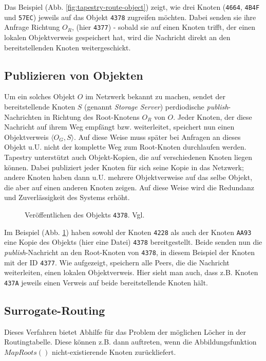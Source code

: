 Das Beispiel (Abb. \ref{fig:tapestry-route-object}) zeigt, wie drei Knoten
(\texttt{4664}, \texttt{4B4F} und \texttt{57EC}) jeweils auf das Objekt
\texttt{4378} zugreifen möchten. Dabei senden sie ihre Anfrage Richtung $O_R$,
(hier \texttt{4377}) - sobald sie auf einen Knoten trifft, der einen lokalen
Objektverweis gespeichert hat, wird die Nachricht direkt an den bereitstellenden
Knoten weitergeschickt.

\subsection{Publizieren von Objekten}
Um ein solches Objekt $O$ im Netzwerk bekannt zu machen, sendet der 
bereitstellende Knoten $S$ (genannt \textsl{Storage Server}) perdiodische 
\textsl{publish}-Nachrichten in Richtung des Root-Knotens $O_R$ von $O$. Jeder 
Knoten, der diese Nachricht auf ihrem Weg empfängt bzw. weiterleitet, speichert 
nun einen Objektverweis $\langle O_G, S \rangle$. Auf diese Weise muss später 
bei Anfragen an dieses Objekt u.U. nicht der komplette Weg zum Root-Knoten 
durchlaufen werden. Tapestry unterstützt auch Objekt-Kopien, die auf 
verschiedenen Knoten liegen können. Dabei publiziert jeder Knoten für sich 
seine Kopie in das Netzwerk; andere Knoten haben dann u.U. mehrere 
Objektverweise auf das selbe Objekt, die aber auf einen anderen Knoten zeigen. 
Auf diese Weise wird die Redundanz und Zuverlässigkeit des Systems erhöht.

\begin{figure}[hp]
  \centering
  \def\JPicScale{0.59}
  
  \caption[Tapestry: Veröffentlichen eines Objekts]{Veröffentlichen des Objekts
  \texttt{4378}. Vgl. \cite[Fig. 4]{TapestryTR}}
  \label{fig:tapestry-publish-object}
\end{figure}

Im Beispiel (Abb. \ref{fig:tapestry-publish-object}) haben sowohl der Knoten 
\texttt{4228} als auch der Knoten \texttt{AA93} eine Kopie des Objekts (hier 
eine Datei) \texttt{4378} bereitgestellt. Beide senden nun die 
\textsl{publish}-Nachricht an den Root-Knoten von \texttt{4378}, in diesem 
Beispiel der Knoten mit der ID \texttt{4377}. Wie aufgezeigt, speichern alle 
Peers, die die Nachricht weiterleiten, einen lokalen Objektverweis. Hier sieht 
man auch, dass z.B. Knoten \texttt{437A} jeweils einen Verweis auf beide 
bereitstellende Knoten hält.

\subsection{Surrogate-Routing} \label{subsec:surrogate-routing}
Dieses Verfahren bietet Abhilfe für das Problem der möglichen Löcher in der
Routingtabelle. Diese können z.B. dann auftreten, wenn die Abbildungsfunktion
$MapRoots()$ nicht-existierende Knoten zurückliefert.

